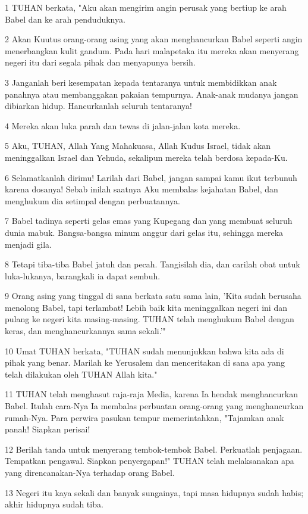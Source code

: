 \par 1 TUHAN berkata, "Aku akan mengirim angin perusak yang bertiup ke arah Babel dan ke arah penduduknya.
\par 2 Akan Kuutus orang-orang asing yang akan menghancurkan Babel seperti angin menerbangkan kulit gandum. Pada hari malapetaka itu mereka akan menyerang negeri itu dari segala pihak dan menyapunya bersih.
\par 3 Janganlah beri kesempatan kepada tentaranya untuk membidikkan anak panahnya atau membanggakan pakaian tempurnya. Anak-anak mudanya jangan dibiarkan hidup. Hancurkanlah seluruh tentaranya!
\par 4 Mereka akan luka parah dan tewas di jalan-jalan kota mereka.
\par 5 Aku, TUHAN, Allah Yang Mahakuasa, Allah Kudus Israel, tidak akan meninggalkan Israel dan Yehuda, sekalipun mereka telah berdosa kepada-Ku.
\par 6 Selamatkanlah dirimu! Larilah dari Babel, jangan sampai kamu ikut terbunuh karena dosanya! Sebab inilah saatnya Aku membalas kejahatan Babel, dan menghukum dia setimpal dengan perbuatannya.
\par 7 Babel tadinya seperti gelas emas yang Kupegang dan yang membuat seluruh dunia mabuk. Bangsa-bangsa minum anggur dari gelas itu, sehingga mereka menjadi gila.
\par 8 Tetapi tiba-tiba Babel jatuh dan pecah. Tangisilah dia, dan carilah obat untuk luka-lukanya, barangkali ia dapat sembuh.
\par 9 Orang asing yang tinggal di sana berkata satu sama lain, 'Kita sudah berusaha menolong Babel, tapi terlambat! Lebih baik kita meninggalkan negeri ini dan pulang ke negeri kita masing-masing. TUHAN telah menghukum Babel dengan keras, dan menghancurkannya sama sekali.'"
\par 10 Umat TUHAN berkata, "TUHAN sudah menunjukkan bahwa kita ada di pihak yang benar. Marilah ke Yerusalem dan menceritakan di sana apa yang telah dilakukan oleh TUHAN Allah kita."
\par 11 TUHAN telah menghasut raja-raja Media, karena Ia hendak menghancurkan Babel. Itulah cara-Nya Ia membalas perbuatan orang-orang yang menghancurkan rumah-Nya. Para perwira pasukan tempur memerintahkan, "Tajamkan anak panah! Siapkan perisai!
\par 12 Berilah tanda untuk menyerang tembok-tembok Babel. Perkuatlah penjagaan. Tempatkan pengawal. Siapkan penyergapan!" TUHAN telah melaksanakan apa yang direncanakan-Nya terhadap orang Babel.
\par 13 Negeri itu kaya sekali dan banyak sungainya, tapi masa hidupnya sudah habis; akhir hidupnya sudah tiba.
